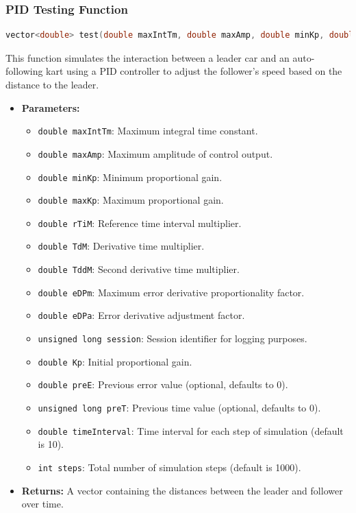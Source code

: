 \documentclass[a4paper,12pt]{article}
\begin{document}
\subsubsection{PID Testing Function}
\begin{lstlisting}[language=C++]
vector<double> test(double maxIntTm, double maxAmp, double minKp, double maxKp, double rTiM, double TdM, double TddM, double eDPm, double eDPa, unsigned long session, double Kp, double preE = 0, unsigned long preT = 0, double timeInterval = 10, int steps = 1000)
\end{lstlisting}
This function simulates the interaction between a leader car and an auto-following kart using a PID controller to adjust the follower's speed based on the distance to the leader.
\begin{itemize}
\item \textbf{Parameters:}
\begin{itemize}
\item \texttt{double maxIntTm}: Maximum integral time constant.
\item \texttt{double maxAmp}: Maximum amplitude of control output.
\item \texttt{double minKp}: Minimum proportional gain.
\item \texttt{double maxKp}: Maximum proportional gain.
\item \texttt{double rTiM}: Reference time interval multiplier.
\item \texttt{double TdM}: Derivative time multiplier.
\item \texttt{double TddM}: Second derivative time multiplier.
\item \texttt{double eDPm}: Maximum error derivative proportionality factor.
\item \texttt{double eDPa}: Error derivative adjustment factor.
\item \texttt{unsigned long session}: Session identifier for logging purposes.
\item \texttt{double Kp}: Initial proportional gain.
\item \texttt{double preE}: Previous error value (optional, defaults to 0).
\item \texttt{unsigned long preT}: Previous time value (optional, defaults to 0).
\item \texttt{double timeInterval}: Time interval for each step of simulation (default is 10).
\item \texttt{int steps}: Total number of simulation steps (default is 1000).
\end{itemize}
\item \textbf{Returns:} A vector containing the distances between the leader and follower over time.
\end{itemize}
\end{document}
